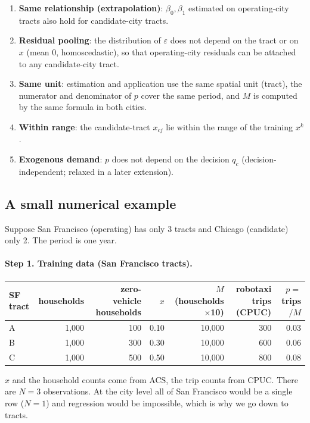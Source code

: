 \documentclass[10pt,a4paper]{article}
\begin{document}
\begin{enumerate}[nosep]
  \item \textbf{Same relationship (extrapolation)}: $\beta_0,\beta_1$ estimated on operating-city tracts also hold for candidate-city tracts.
  \item \textbf{Residual pooling}: the distribution of $\varepsilon$ does not depend on the tract or on $x$ (mean 0, homoscedastic), so that operating-city residuals can be attached to any candidate-city tract.
  \item \textbf{Same unit}: estimation and application use the same spatial unit (tract), the numerator and denominator of $p$ cover the same period, and $M$ is computed by the same formula in both cities.
  \item \textbf{Within range}: the candidate-tract $x_{cj}$ lie within the range of the training $x^k$.
  \item \textbf{Exogenous demand}: $p$ does not depend on the decision $q_c$ (decision-independent; relaxed in a later extension).
\end{enumerate}

\subsection{A small numerical example}

Suppose San Francisco (operating) has only 3 tracts and Chicago (candidate) only 2. The period is one year.

\paragraph{Step 1. Training data (San Francisco tracts).}
\begin{table}[H]\centering\small
\begin{tabular}{@{}lrrrrrr@{}}
\toprule
SF tract & households & zero-vehicle households & $x$ & $M$ (households$\times$10) & robotaxi trips (CPUC) & $p=$ trips$/M$ \\ \midrule
A & 1{,}000 & 100 & 0.10 & 10{,}000 & 300 & 0.03 \\
B & 1{,}000 & 300 & 0.30 & 10{,}000 & 600 & 0.06 \\
C & 1{,}000 & 500 & 0.50 & 10{,}000 & 800 & 0.08 \\
\bottomrule
\end{tabular}
\end{table}
$x$ and the household counts come from ACS, the trip counts from CPUC. There are $N=3$ observations. At the city level all of San Francisco would be a single row ($N=1$) and regression would be impossible, which is why we go down to tracts.
\end{document}
